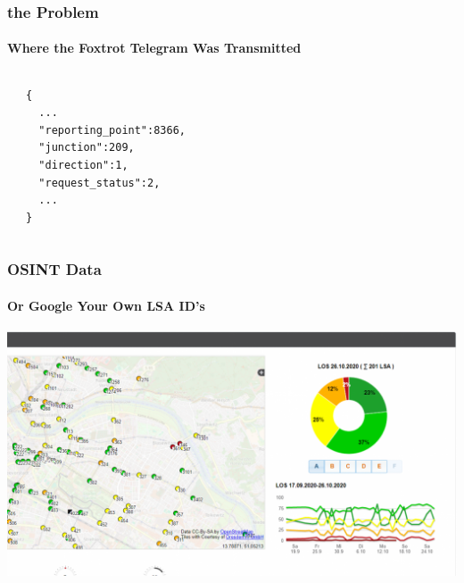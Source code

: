 







\begin{frame}[fragile]
  \frametitle{the Problem}
  \framesubtitle{Where the Foxtrot Telegram Was Transmitted}

  \begin{columns}

    \begin{itemize}
  \end{itemize}


  \begin{lstlisting}[basicstyle=\scriptsize]
{
  ...
  "reporting_point":8366,
  "junction":209,
  "direction":1,
  "request_status":2,
  ...
}
  \end{lstlisting}

\end{columns}

\end{frame}

\begin{frame}
  \frametitle{OSINT Data}
  \framesubtitle{Or Google Your Own LSA ID's}
  \centering
  \includegraphics[width=.8\textwidth]{./figs/urbic-osint.png}
\end{frame}


